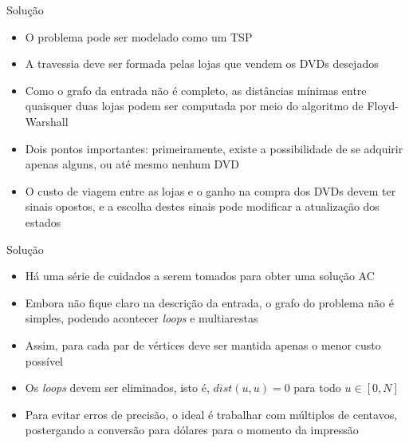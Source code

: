 \begin{frame}[fragile]{Solução}

    \begin{itemize}
        \item O problema pode ser modelado como um TSP

        \item A travessia deve ser formada pelas lojas que vendem os DVDs desejados

        \item Como o grafo da entrada não é completo, as distâncias mínimas entre quaisquer duas
            lojas podem ser computada por meio do algoritmo de Floyd-Warshall

        \item Dois pontos importantes: primeiramente, existe a possibilidade de se adquirir
            apenas alguns, ou até mesmo nenhum DVD

        \item O custo de viagem entre as lojas e o ganho na compra dos DVDs devem ter sinais
            opostos, e a escolha destes sinais pode modificar a atualização dos estados
    \end{itemize}

\end{frame}

\begin{frame}[fragile]{Solução}

    \begin{itemize}
        \item Há uma série de cuidados a serem tomados para obter uma solução AC

        \item Embora não fique claro na descrição da entrada, o grafo do problema não é 
            simples, podendo acontecer \textit{loops} e multiarestas

        \item Assim, para cada par de vértices deve ser mantida apenas o menor custo possível

        \item Os \textit{loops} devem ser eliminados, isto é, $dist(u, u) = 0$ para todo 
            $u\in [0, N]$
        
        \item Para evitar erros de precisão, o ideal é trabalhar com múltiplos de centavos,
            postergando a conversão para dólares para o momento da impressão
   \end{itemize}

\end{frame}

